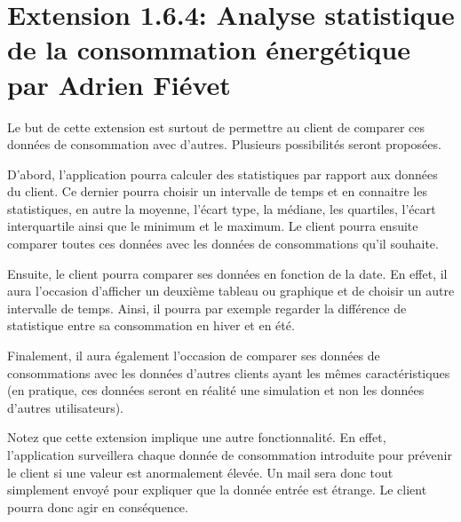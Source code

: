 \section{Extension 1.6.4: Analyse statistique de la consommation énergétique par Adrien Fiévet}

\begin{flushleft}
Le but de cette extension est surtout de permettre au client de comparer ces données de consommation avec d'autres. Plusieurs possibilités seront proposées.
\end{flushleft}

\begin{flushleft}
D'abord, l'application pourra calculer des statistiques par rapport aux données du client. Ce dernier pourra choisir un intervalle de temps et en connaitre les statistiques, en autre la moyenne, l'écart type, la médiane, les quartiles, l'écart interquartile ainsi que le minimum et le maximum. Le client pourra ensuite comparer toutes ces données avec les données de consommations qu'il souhaite.
\end{flushleft}

\begin{flushleft}
Ensuite, le client pourra comparer ses données en fonction de la date. En effet, il aura l'occasion d'afficher un deuxième tableau ou graphique et de choisir un autre intervalle de temps. Ainsi, il pourra par exemple regarder la différence de statistique entre sa consommation en hiver et en été.
\end{flushleft}

\begin{flushleft}
Finalement, il aura également l'occasion de comparer ses données de consommations avec les données d'autres clients ayant les mêmes caractéristiques (en pratique, ces données seront en réalité une simulation et non les données d'autres utilisateurs).
\end{flushleft}

\begin{flushleft}
Notez que cette extension implique une autre fonctionnalité. En effet, l'application surveillera chaque donnée de consommation introduite pour prévenir le client si une valeur est anormalement élevée. Un mail sera donc tout simplement envoyé pour expliquer que la donnée entrée est étrange. Le client pourra donc agir en conséquence.
\end{flushleft}
